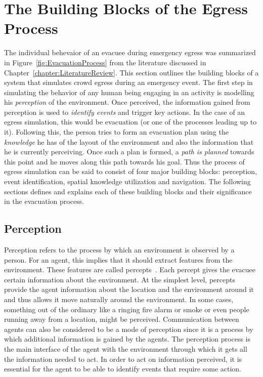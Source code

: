 \section{The Building Blocks of the Egress Process}
\label{IBEVAC:EgressProgress}

The individual behevaior of an evacuee during emergency egress was summarized in Figure~\ref{fig:EvacuationProcess} from the literature discussed in Chapter~\ref{chapter:LiteratureReview}. This section outlines the building blocks of a system that simulates crowd egress during an emergency event. The first step in simulating the behavior of any human being engaging in an activity is modelling his \emph{perception} of the environment. Once perceived, the information gained from perception is used to \emph{identify events} and trigger key actions. In the case of an egress simulation, this would be evacuation (or one of the processes leading up to it). Following this, the person tries to form an evacuation plan using the \emph{knowledge} he has of the layout of the environment and also the information that he is currently perceiving. Once such a plan is formed, a \emph{path is planned} towards this point and he moves along this path towards his goal. Thus the process of egress simulation can be said to consist of four major building blocks: perception, event identification, spatial knowledge utilization and navigation. The following sections defines and explains each of these building blocks and their significance in the evacuation process.

\subsection{Perception}
\label{IBEVAC:IBP}

	Perception refers to the process by which an environment is observed by a person. For an agent, this implies that it should extract features from the environment. These features are called percepts~\cite{Russel:1995vi}. Each percept gives the evacuee certain information about the environment. At the simplest level, percepts provide the agent information about the location and the environment around it and thus allows it move naturally around the environment. In some cases, something out of the ordinary like a ringing fire alarm or smoke or even people running away from a location, might be perceived. Communication between agents can also be considered to be a mode of perception since it is a process by which additional information is gained by the agents. The perception process is the main interface of the agent with the environment through which it gets all the information needed to act. In order to act on information perceived, it is essential for the agent to be able to identify events that require some action.

